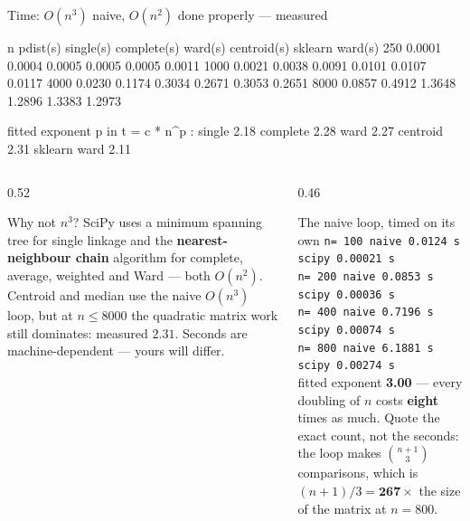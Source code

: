 \documentclass[aspectratio=169]{beamer}
\begin{document}
\begin{frame}[fragile,shrink=8]{Time: $O(n^3)$ naive, $O(n^2)$ done properly --- measured}
\begin{outblk}
     n   pdist(s)  single(s)  complete(s)   ward(s)  centroid(s)  sklearn ward(s)
   250     0.0001     0.0004       0.0005    0.0005       0.0005          0.0011
  1000     0.0021     0.0038       0.0091    0.0101       0.0107          0.0117
  4000     0.0230     0.1174       0.3034    0.2671       0.3053          0.2651
  8000     0.0857     0.4912       1.3648    1.2896       1.3383          1.2973

  fitted exponent p in t = c * n^p :  single 2.18  complete 2.28  ward 2.27
                                      centroid 2.31  sklearn ward 2.11
\end{outblk}
  \vspace{0.2em}
  \begin{columns}[T]
    \begin{column}{0.52\textwidth}
      \begin{block}{Why not $n^3$?}
        \scriptsize SciPy uses a minimum spanning tree for single linkage and
        the \textbf{nearest-neighbour chain} algorithm for complete, average,
        weighted and Ward --- both $O(n^2)$. Centroid and median use the naive
        $O(n^3)$ loop, but at $n \le 8000$ the quadratic matrix work still
        dominates: measured $2.31$. \alert{Seconds are machine-dependent ---
        yours will differ.}
      \end{block}
    \end{column}
    \begin{column}{0.46\textwidth}
      \begin{alertblock}{The naive loop, timed on its own}
        \tiny
        \texttt{n= 100 naive 0.0124 s  scipy 0.00021 s}\\
        \texttt{n= 200 naive 0.0853 s  scipy 0.00036 s}\\
        \texttt{n= 400 naive 0.7196 s  scipy 0.00074 s}\\
        \texttt{n= 800 naive 6.1881 s  scipy 0.00274 s}\\[0.2em]
        fitted exponent \textbf{3.00} --- every doubling of $n$ costs
        \textbf{eight} times as much. Quote the exact count, not the
        seconds: the loop makes $\binom{n+1}{3}$ comparisons, which is
        $(n+1)/3 = \textbf{267}\times$ the size of the matrix at $n = 800$.
      \end{alertblock}
    \end{column}
  \end{columns}
\end{frame}
\end{document}
